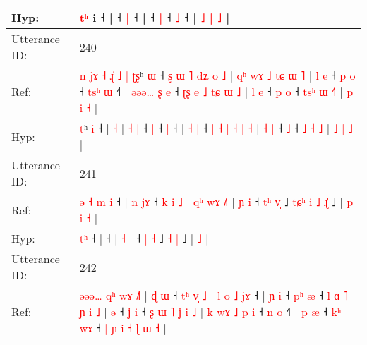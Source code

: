 \documentclass[10pt]{article}
\DeclareRobustCommand{\hl}[1]{{\textcolor{red}{#1}}}
\begin{document}
\begin{longtable}{ll}
Hyp: & \hl{}\hl{}\hl{}\hl{t}\hl{ʰ} i\hl{}\hl{}\hl{}\hl{}\hl{}\hl{} ˧\hl{}\hl{}\hl{}\hl{}\hl{} |\hl{}\hl{}\hl{}\hl{}\hl{}\hl{}\hl{}\hl{}\hl{} ˧\hl{}\hl{}\hl{} \hl{|} ˧\hl{} |\hl{}\hl{}\hl{}\hl{} ˧\hl{}\hl{} \hl{|} ˧\hl{}\hl{}\hl{}\hl{} \hl{˩} ˧\hl{} | \hl{˩} \hl{|} \hl{˩} |
 \\
\midrule
Utterance ID: & 240 \\
Ref: & \hl{n}\hl{ }\hl{j}\hl{ɤ}\hl{ }\hl{˧}\hl{ }\hl{ɻ}\hl{̍}\hl{ }\hl{˩}\hl{ }\hl{|}\hl{ }\hl{ʈ}\hl{ʂ}ʰ \hl{ɯ} ˧\hl{ }\hl{ʂ}\hl{ }\hl{ɯ}\hl{ }\hl{˥}\hl{ }\hl{d}\hl{ʑ}\hl{ }\hl{o}\hl{ }\hl{˩} |\hl{ }\hl{q}\hl{ʰ}\hl{ }\hl{w}\hl{ɤ}\hl{ }\hl{˩}\hl{ }\hl{t}\hl{ɕ}\hl{ }\hl{ɯ} \hl{˥} | \hl{l} \hl{e} ˧\hl{ }\hl{p} \hl{o} ˧\hl{ }\hl{t}\hl{s}\hl{ʰ} \hl{ɯ} ˧\hl{˥} |\hl{ }\hl{ə}\hl{ə}\hl{ə}\hl{…} \hl{ʂ} \hl{e} ˧ \hl{ʈ}\hl{ʂ} \hl{e} \hl{˩} \hl{t}\hl{ɕ} \hl{ɯ} \hl{˩} | \hl{l} \hl{e} ˧\hl{ }\hl{p} \hl{o} ˧ \hl{t}\hl{s}\hl{ʰ} \hl{ɯ} \hl{˧}\hl{˥} | \hl{p} \hl{i} \hl{˧} |
 \\
Hyp: & \hl{}\hl{}\hl{}\hl{}\hl{}\hl{}\hl{}\hl{}\hl{}\hl{}\hl{}\hl{}\hl{}\hl{}\hl{}\hl{t}ʰ \hl{i} ˧\hl{}\hl{}\hl{}\hl{}\hl{}\hl{}\hl{}\hl{}\hl{}\hl{}\hl{}\hl{}\hl{} |\hl{}\hl{}\hl{}\hl{}\hl{}\hl{}\hl{}\hl{}\hl{}\hl{}\hl{}\hl{}\hl{} \hl{˧} | \hl{˧} \hl{|} ˧\hl{}\hl{} \hl{|} ˧\hl{}\hl{}\hl{}\hl{} \hl{|} ˧\hl{} |\hl{}\hl{}\hl{}\hl{}\hl{} \hl{˧} \hl{|} ˧ \hl{}\hl{|} \hl{˧} \hl{|} \hl{}\hl{˧} \hl{|} \hl{˧} | \hl{˧} \hl{|} ˧\hl{}\hl{} \hl{˩} ˧ \hl{}\hl{}\hl{˩} \hl{˧} \hl{}\hl{˩} | \hl{˩} \hl{|} \hl{˩} |
 \\
\midrule
Utterance ID: & 241 \\
Ref: & \hl{ə}\hl{ }\hl{˧}\hl{ }\hl{m}\hl{ }\hl{i} ˧ |\hl{ }\hl{n}\hl{ }\hl{j}\hl{ɤ} ˧\hl{ }\hl{k}\hl{ }\hl{i}\hl{ }\hl{˩} |\hl{ }\hl{q}\hl{ʰ}\hl{ }\hl{w}\hl{ɤ} \hl{˩}\hl{˥} |\hl{ }\hl{ɲ}\hl{ }\hl{i} ˧ \hl{t}\hl{ʰ} \hl{v}\hl{̩} ˩\hl{ }\hl{t}\hl{ɕ}\hl{ʰ}\hl{ }\hl{i} \hl{˩} \hl{ɻ}\hl{̍} ˩ |\hl{ }\hl{p}\hl{ }\hl{i} \hl{˧} |
 \\
Hyp: & \hl{}\hl{}\hl{}\hl{}\hl{}\hl{t}\hl{ʰ} ˧ |\hl{}\hl{}\hl{}\hl{}\hl{} ˧\hl{}\hl{}\hl{}\hl{}\hl{}\hl{} |\hl{}\hl{}\hl{}\hl{}\hl{}\hl{} \hl{}\hl{˧} |\hl{}\hl{}\hl{}\hl{} ˧ \hl{}\hl{|} \hl{}\hl{˧} ˩\hl{}\hl{}\hl{}\hl{}\hl{}\hl{} \hl{˧} \hl{}\hl{|} ˩ |\hl{}\hl{}\hl{}\hl{} \hl{˩} |
 \\
\midrule
Utterance ID: & 242 \\
Ref: & \hl{ə}\hl{ə}\hl{ə}\hl{…}\hl{ }\hl{q}\hl{ʰ}\hl{ }\hl{w}\hl{ɤ}\hl{ }\hl{˩}\hl{˥}\hl{ }|\hl{ }\hl{ɖ}\hl{ }\hl{ɯ} ˧\hl{ }\hl{t}\hl{ʰ}\hl{ }\hl{v}\hl{̩}\hl{ }\hl{˩} |\hl{ }\hl{l}\hl{ }\hl{o}\hl{ }\hl{˩}\hl{ }\hl{j}\hl{ɤ} ˧ |\hl{ }\hl{ɲ}\hl{ }\hl{i} ˧\hl{ }\hl{p}\hl{ʰ} \hl{æ} ˧\hl{ }\hl{l}\hl{ }\hl{ɑ}\hl{ }\hl{˥}\hl{ }\hl{ɲ}\hl{ }\hl{i}\hl{ }\hl{˩} |\hl{ }\hl{ə} ˧\hl{ }\hl{ʝ} \hl{i} ˧\hl{ }\hl{ʂ}\hl{ }\hl{ɯ}\hl{ }\hl{˥}\hl{ }\hl{ʝ}\hl{ }\hl{i}\hl{ }\hl{˩} |\hl{ }\hl{k}\hl{ }\hl{w}\hl{ɤ}\hl{ }\hl{˩}\hl{ }\hl{p}\hl{ }\hl{i} ˧\hl{ }\hl{n} \hl{o} ˧\hl{˥} | \hl{p} \hl{æ} ˧\hl{ }\hl{k}\hl{ʰ} \hl{w}\hl{ɤ} ˧ \hl{|} \hl{ɲ} \hl{i} \hl{˧} \hl{ɭ} \hl{ɯ} \hl{˧} |

\end{longtable}
\end{document}
